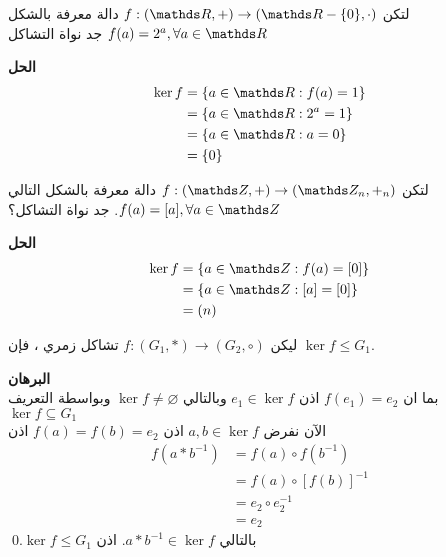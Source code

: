 \begin{example}
	لتكن
	$f : (\R, +) \to (\R-\{0\}, \cdot)$
	دالة معرفة بالشكل 
	$f(a) = 2^a, \forall a\in \R$
	جد نواة التشاكل
\end{example}
\noindent
\textbf{الحل}
\begin{align*}
	\ker f &= \{a \in \R  : f(a) = 1\}\\
&= \{a\in \R : 2^a = 1\}\\
&= \{a\in \R : a =0 \}\\
&= \{0\}
\end{align*}
	\begin{example}
		لتكن 
		$f : (\Z, +) \to (\Z_n, +_n)$ دالة معرفة بالشكل التالي $f(a) = [a], \forall a\in \Z$. جد نواة التشاكل؟
	\end{example}
	\noindent
	\textbf{الحل}
	\begin{align*}
		 \ker f &= \{a \in \Z: f(a) = [0]\}\\
		 &= \{a\in \Z: [a] = [0]\}\\
&= (n)
	\end{align*}
	
	\begin{theorem}
			ليكن 	$f : (G_1, *) \to (G_2, \circ)$ تشاكل زمري ، فإن $\ker f\leq G_1$.
	\end{theorem}
	\noindent
	\textbf{البرهان}\\
	\noindent
	بما ان $f(e_1) = e_2$ اذن $e_1\in \ker f$ وبالتالي $\ker f\neq \varnothing$ وبواسطة التعريف $\ker f \subseteq G_1$ \\
	الآن نفرض $a, b\in \ker f$ اذن $f(a) = f(b) = e_2$ اذن
	\begin{align*}
		f(a * b^{-1}) &= f(a) \circ f(b^{-1})\\
		&= f(a) \circ  [f(b)]^{-1}\\
		&= e_2 \circ  e_2^{-1}\\
		&= e_2
	\end{align*}
	بالتالي $a * b^{-1} \in \ker f$. اذن $\ker f\leq G_1$.\qed
	
